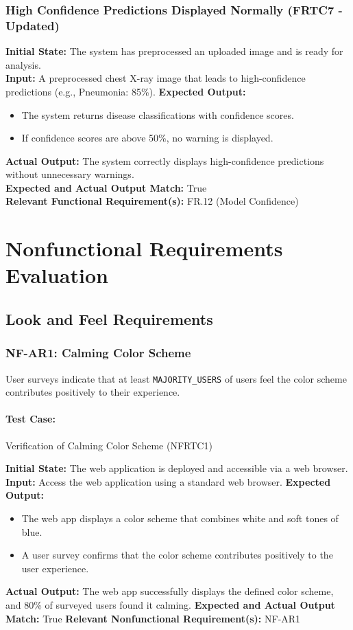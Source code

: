 \documentclass[12pt, titlepage]{article}
\begin{document}
\subsubsection{High Confidence Predictions Displayed Normally (FRTC7 - Updated)}
\textbf{Initial State:} The system has preprocessed an uploaded image and is ready for analysis.\\
\textbf{Input:} A preprocessed chest X-ray image that leads to high-confidence predictions (e.g., Pneumonia: 85\%).
\textbf{Expected Output:}
\begin{itemize}
\item The system returns disease classifications with confidence scores.
\item If confidence scores are above 50\%, no warning is displayed.
\end{itemize}
\textbf{Actual Output:} The system correctly displays high-confidence predictions without unnecessary warnings.\\
\textbf{Expected and Actual Output Match:} True\\
\textbf{Relevant Functional Requirement(s):} FR.12 (Model Confidence)\\


\section{Nonfunctional Requirements Evaluation}
\subsection{Look and Feel Requirements}

\subsubsection{NF-AR1: Calming Color Scheme}
User surveys indicate that at least \verb|MAJORITY_USERS| of users feel the color scheme contributes positively to their experience.

\paragraph{Test Case:} Verification of Calming Color Scheme (NFRTC1)

\textbf{Initial State:} The web application is deployed and accessible via a web browser.  
\textbf{Input:} Access the web application using a standard web browser.  
\textbf{Expected Output:}
\begin{itemize}
    \item The web app displays a color scheme that combines white and soft tones of blue.
    \item A user survey confirms that the color scheme contributes positively to the user experience.
\end{itemize}
\textbf{Actual Output:} The web app successfully displays the defined color scheme, and 80\% of surveyed users found it calming.
\textbf{Expected and Actual Output Match:} True
\textbf{Relevant Nonfunctional Requirement(s):} NF-AR1
\end{document}
